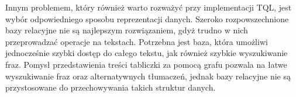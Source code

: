 Innym problemem, który również warto rozważyć przy implementacji TQL, jest wybór odpowiedniego sposobu reprezentacji danych. Szeroko rozpowszechnione
bazy relacyjne nie są najlepszym rozwiązaniem, gdyż trudno w nich przeprowadzać operacje na tekstach. Potrzebna jest baza, która umożliwi jednocześnie szybki
dostęp do całego tekstu, jak również szybkie wyszukiwanie fraz. Pomysł przedstawienia treści tabliczki za pomocą grafu pozwala na łatwe wyszukiwanie fraz oraz
alternatywnych tłumaczeń, jednak bazy relacyjne nie są przystosowane do przechowywania takich struktur danych.


